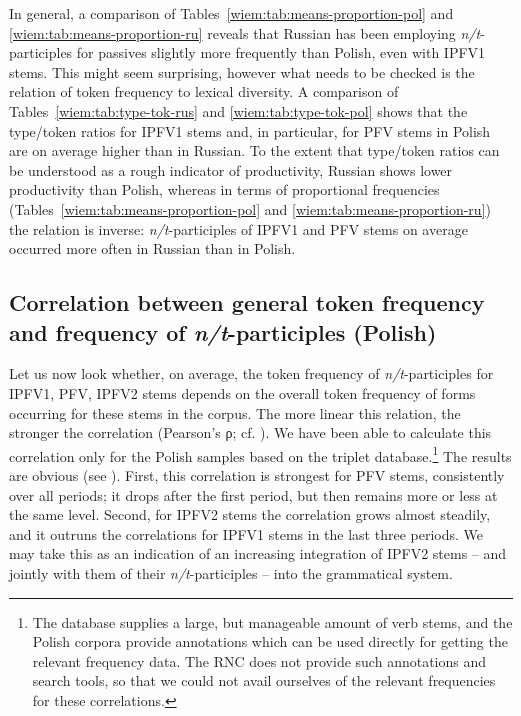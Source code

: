 \documentclass[output=paper]{langscibook}
\begin{document}
In general, a comparison of Tables~\ref{wiem:tab:means-proportion-pol} and \ref{wiem:tab:means-proportion-ru} reveals that Russian has been employing \textit{n/t}-participles for passives slightly more frequently than Polish, even with IPFV1 stems. This might seem surprising, however what needs to be checked is the relation of token frequency to lexical diversity. A comparison of Tables~\ref{wiem:tab:type-tok-rus} and \ref{wiem:tab:type-tok-pol} shows that the type/token ratios for IPFV1 stems and, in particular, for PFV stems in Polish are on average higher than in Russian. To the extent that type/token ratios can be understood as a rough indicator of productivity, Russian shows lower productivity than Polish, whereas in terms of proportional frequencies (Tables~\ref{wiem:tab:means-proportion-pol} and \ref{wiem:tab:means-proportion-ru}) the relation is inverse: \textit{n/t}-participles of IPFV1 and PFV stems on average occurred more often in Russian than in Polish.\largerpage[2]

\subsection{Correlation between general token frequency and frequency of \textit{n/t}-participles (Polish)}\label{wiem:sec:correlation}

Let us now look whether, on average, the token frequency of \textit{n/t}-participles for IPFV1, PFV, IPFV2 stems depends on the overall token frequency of forms occurring for these stems in the corpus. The more linear this relation, the stronger the correlation (Pearson’s ρ; cf. \citealt[116--126]{Levshina2015}). We have been able to calculate this correlation only for the Polish samples based on the triplet database.\footnote{The database supplies a large, but manageable amount of verb stems, and the Polish corpora provide annotations which can be used directly for getting the relevant frequency data. The RNC does not provide such annotations and search tools, so that we could not avail ourselves of the relevant frequencies for these correlations.} The results are obvious (see ). First, this correlation is strongest for PFV stems, consistently over all periods; it drops after the first period, but then remains more or less at the same level. Second, for IPFV2 stems the correlation grows almost steadily, and it outruns the correlations for IPFV1 stems in the last three periods. We may take this as an indication of an increasing integration of IPFV2 stems -- and jointly with them of their \textit{n/t}-participles -- into the grammatical system.
\end{document}
